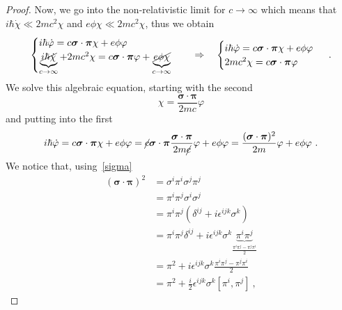 \begin{proof}
        Now, we go into the non-relativistic limit for $c \rightarrow \infty$ which means that $i \hbar \dot \chi \ll 2 m c^2 \chi$ and $e \phi \chi \ll 2 m c^2 \chi$, thus we obtain 
        \begin{equation*}
            \begin{cases}
                i \hbar \dot \varphi = c \boldsymbol \sigma \cdot \boldsymbol \pi \chi + e \phi \varphi\\
                \underbrace{\cancel{i \hbar \dot \chi}}_{c \rightarrow \infty} + 2m c^2 \chi = c \boldsymbol \sigma \cdot \boldsymbol \pi \varphi + \underbrace{\cancel{e \phi \chi}}_{c \rightarrow \infty}\\
            \end{cases} \quad \Rightarrow \quad \begin{cases}
                i \hbar \dot \varphi = c \boldsymbol \sigma \cdot \boldsymbol \pi \chi + e \phi \varphi\\
                2m c^2 \chi = c \boldsymbol \sigma \cdot \boldsymbol \pi \varphi\\
            \end{cases} ~.
        \end{equation*}
        We solve this algebraic equation, starting with the second 
        \begin{equation*}
            \chi = \frac{\boldsymbol \sigma \cdot \boldsymbol \pi}{2 m c} \varphi
        \end{equation*}
        and putting into the first
        \begin{equation*}
            i \hbar \dot \varphi = c \boldsymbol \sigma \cdot \boldsymbol \pi \chi + e \phi \varphi = \cancel{c} \boldsymbol \sigma \cdot \boldsymbol \pi \frac{\boldsymbol \sigma \cdot \boldsymbol \pi}{2 m \cancel{c}} \varphi + e \phi \varphi = \frac{(\boldsymbol \sigma \cdot \boldsymbol \pi)^2}{2m} \varphi + e \phi \varphi ~.
        \end{equation*}
        We notice that, using~\eqref{sigma}
        \begin{equation*}
        \begin{aligned}
            (\boldsymbol \sigma \cdot \boldsymbol \pi)^2 & = \sigma^i \pi^i \sigma^j \pi^j \\ & = \pi^i \pi^j \sigma^i \sigma^j \\ & = \pi^i \pi^j (\delta^{ij} + i \epsilon^{ijk} \sigma^k) \\ & = \pi^i \pi^j \delta^{ij} + i \epsilon^{ijk} \sigma^k \underbrace{\pi^i \pi^j}_{\frac{\pi^i \pi^j - \pi^j \pi^i}{2}} \\ & = \pi^2 + i \epsilon^{ijk} \sigma^k \frac{\pi^i \pi^j - \pi^j \pi^i}{2} \\ & = \pi^2 + \frac{i}{2} \epsilon^{ijk} \sigma^k [\pi^i, \pi^j]  ~,

\end{aligned}
\end{equation*}
\end{proof}
